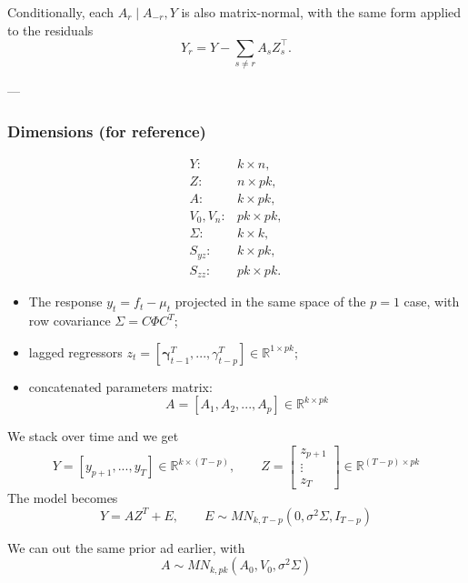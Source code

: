 Conditionally, each \(A_r \mid A_{-r}, Y\) is also matrix-normal, with the same form applied to the residuals
\[
Y_r = Y - \sum_{s \neq r} A_s Z_s^\top.
\]

---

\subsubsection{Dimensions (for reference)}

\[
\begin{array}{ll}
Y: & k \times n, \\
Z: & n \times pk, \\
A: & k \times pk, \\
V_0, V_n: & pk \times pk, \\
\Sigma: & k \times k, \\
S_{yz}: & k \times pk, \\
S_{zz}: & pk \times pk.
\end{array}
\]

\begin{itemize}
    \item The response $y_t = f_t - \mu_t$ projected in the same space of the $p=1$ case, with row covariance $\Sigma = C \Phi C^T$;
    \item lagged regressors $z_t = [ \boldsymbol{\gamma}_{t-1}^T, ..., \gamma_{t-p}^T] \in \mathbb{R}^{1\times pk}$;
    \item concatenated parameters matrix: 
    \begin{equation}
        A = [A_1, A_2, ..., A_p] \in \mathbb{R}^{k \times pk}
    \end{equation}
\end{itemize}

We stack over time and we get
\begin{equation}
    Y = [y_{p+1}, ..., y_T] \in \mathbb{R}^{k \times (T-p)}, \qquad Z =  \left[\begin{matrix}
        z_{p+1} \\ \vdots \\ z_T
    \end{matrix} \right] \in \mathbb{R}^{(T-p)\times pk} 
\end{equation}
The model becomes
\begin{equation}
    Y = AZ^T + E, \qquad E \sim MN_{k, T-p}(0, \sigma^2 \Sigma, I_{T-p})
\end{equation}

We can out the same prior ad earlier, with
\begin{equation}
    A \sim MN_{k, pk}(A_0, V_0, \sigma^2 \Sigma)
\end{equation}